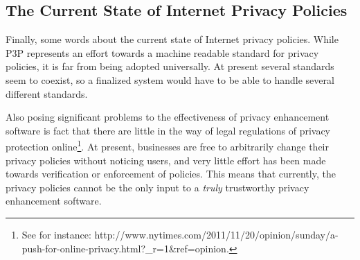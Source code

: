 \subsection{The Current State of Internet Privacy Policies}
Finally, some words about the current state of Internet privacy policies. While P3P represents
an effort towards a machine readable standard for privacy policies, it is far from being adopted
universally. At present several standards seem to coexist, so a finalized system would have to
be able to handle several different standards.

Also posing significant problems to the effectiveness of privacy enhancement software is fact 
that there are little in the way of legal regulations of privacy protection online\footnote{See for instance:
http://www.nytimes.com/2011/11/20/opinion/sunday/a-push-for-online-privacy.html?_r=1&ref=opinion.}.
At present, businesses are free to arbitrarily change their privacy policies without noticing users,
and very little effort has been made towards verification or enforcement of policies. This means that currently,
the privacy policies cannot be the only input to a \emph{truly} trustworthy privacy enhancement software.


